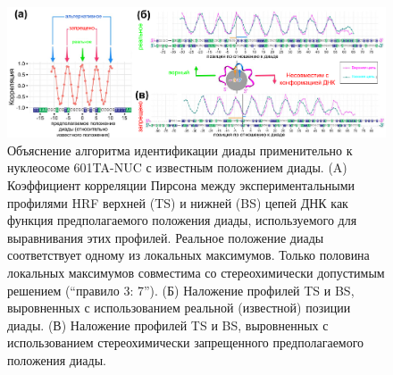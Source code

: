 \begin{figure}[H]
    \centering
    \includegraphics[width=\textwidth]{images/p5/part5_2_nar/p5_2_f7.pdf}
    \caption[Объяснение алгоритма идентификации диады применительно к нуклеосоме 601TA-NUC с известным положением диады]{Объяснение алгоритма идентификации диады применительно к нуклеосоме 601TA-NUC с известным положением диады. (A) Коэффициент корреляции Пирсона между экспериментальными профилями HRF верхней (TS) и нижней (BS) цепей ДНК как функция предполагаемого положения диады, используемого для выравнивания этих профилей. Реальное положение диады соответствует одному из локальных максимумов. Только половина локальных максимумов совместима со стереохимически допустимым решением (``правило 3: 7''). (Б) Наложение профилей TS и BS, выровненных с использованием реальной (известной) позиции диады. (В) Наложение профилей TS и BS, выровненных с использованием стереохимически запрещенного предполагаемого положения диады.}
    \label{fig:p5:p5_2_f7}
\end{figure}


